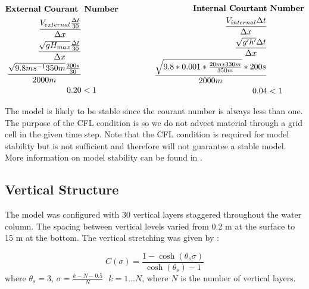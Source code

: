 \begin{equation*}
\begin{aligned}[c]
\text{\bf External Courant } &  \text{ \bf Number} \\
	\frac{V_{external} \frac{\Delta t}{30}}{\Delta x} & \\
	\frac{\sqrt{gH_{max}} \frac{\Delta t}{30}}{\Delta x} & \\
	\frac{\sqrt{9.8 ms^{-1} 350m} \frac{200 s}{30}}{2000m} & \\
	0.20 & < 1
\end{aligned}
\qquad\ \qquad
\begin{aligned}[c]
\text{\bf Internal Courtant} &  \text{ \bf Number}  \\
	\frac{V_{internal}\Delta t}{\Delta x} & \\
	\frac{\sqrt{g^{\prime}h^{\prime}}\Delta t}{\Delta x} & \\
	\frac{\sqrt{9.8*0.001*\frac{20m * 330m}{350m}} * 200 s}{2000m} & \\
	0.04 & < 1
\end{aligned}
\end{equation*}

The model is likely to be stable since the courant number is always less than one. The purpose of the CFL condition is so we do not advect material through a grid cell
in the given time step. Note that the CFL condition is required for model stability but is not sufficient and therefore will not guarantee a stable model. More information
on model stability can be found in \citet{glover_modeling_methods}.

\subsection{Vertical Structure}

The model was configured with 30 vertical layers staggered throughout the water column. The spacing between vertical levels varied from 0.2 m at the surface
to 15 m at the bottom. The vertical stretching was given by : 

\begin{equation} 
	C(\sigma)=\frac{1-\cosh(\theta_s \sigma)}{\cosh(\theta_s) -1} 
\end{equation}
where $\theta_s=3$,  $\sigma=\frac{k-N-0.5}{N}\text{\ \ \ } k=1\ldots N$, where $N$ is the number of vertical layers. 

